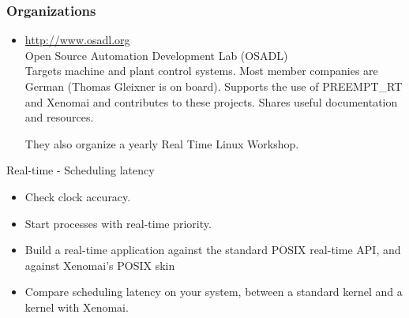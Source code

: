 \begin{frame}
  \frametitle{Organizations}
  \begin{itemize}
  \item \url{http://www.osadl.org}\\
    Open Source Automation Development Lab (OSADL)\\
    Targets machine and plant control systems. Most member companies
    are German (Thomas Gleixner is on board). Supports the use of
    PREEMPT\_RT and Xenomai and contributes to these projects. Shares
    useful documentation and resources.

    They also organize a yearly Real Time Linux Workshop.
  \end{itemize}
\end{frame}

\setuplabframe
{Real-time - Scheduling latency}
{
  \begin{itemize}
  \item Check clock accuracy.
  \item Start processes with real-time priority.
  \item Build a real-time application against the standard POSIX
        real-time API, and against Xenomai’s POSIX skin
  \item Compare scheduling latency on your system, between a standard
        kernel and a kernel with Xenomai.
  \end{itemize}
}

